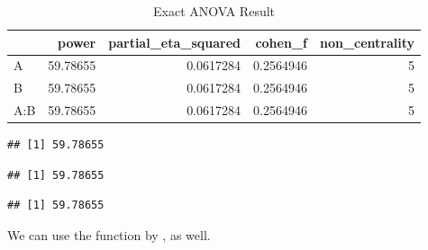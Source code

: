 \documentclass[]{book}
\newenvironment{Shaded}{\begin{snugshade}}{\end{snugshade}}
\newcommand{\CommentTok}[1]{\textcolor[rgb]{0.56,0.35,0.01}{\textit{#1}}}
\newcommand{\KeywordTok}[1]{\textcolor[rgb]{0.13,0.29,0.53}{\textbf{#1}}}
\newcommand{\NormalTok}[1]{#1}
\newcommand{\OperatorTok}[1]{\textcolor[rgb]{0.81,0.36,0.00}{\textbf{#1}}}
\newcommand{\StringTok}[1]{\textcolor[rgb]{0.31,0.60,0.02}{#1}}
\begin{document}
\begin{table}[!h]

\caption{\label{tab:unnamed-chunk-309}Exact ANOVA Result}
\centering
\begin{tabular}{l|r|r|r|r}
\hline
  & power & partial\_eta\_squared & cohen\_f & non\_centrality\\
\hline
A & 59.78655 & 0.0617284 & 0.2564946 & 5\\
\hline
B & 59.78655 & 0.0617284 & 0.2564946 & 5\\
\hline
A:B & 59.78655 & 0.0617284 & 0.2564946 & 5\\
\hline
\end{tabular}
\end{table}

\begin{Shaded}
\end{Shaded}

\begin{verbatim}
## [1] 59.78655
\end{verbatim}

\begin{Shaded}
\end{Shaded}

\begin{verbatim}
## [1] 59.78655
\end{verbatim}

\begin{Shaded}
\end{Shaded}

\begin{verbatim}
## [1] 59.78655
\end{verbatim}

We can use the function by \citep{R-pwr2ppl}, as well.
\end{document}
